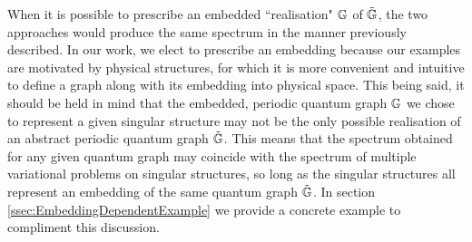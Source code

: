When it is possible to prescribe an embedded ``realisation" $\mathbb{G}$ of $\tilde{\mathbb{G}}$, the two approaches would produce the same spectrum in the manner previously described.
In our work, we elect to prescribe an embedding because our examples are motivated by physical structures, for which it is more convenient and intuitive to define a graph along with its embedding into physical space.
This being said, it should be held in mind that the embedded, periodic quantum graph $\mathbb{G}$ we chose to represent a given singular structure may not be the only possible realisation of an abstract periodic quantum graph $\tilde{\mathbb{G}}$.
This means that the spectrum obtained for any given quantum graph may coincide with the spectrum of multiple variational problems on singular structures, so long as the singular structures all represent an embedding of the same quantum graph $\tilde{\mathbb{G}}$.
In section \ref{ssec:EmbeddingDependentExample} we provide a concrete example to compliment this discussion.